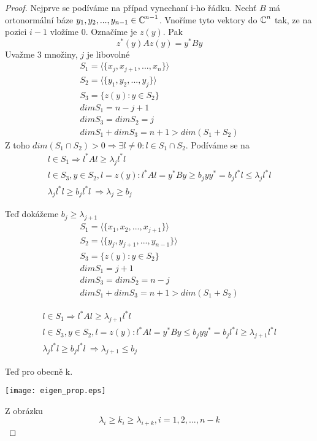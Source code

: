 \begin{proof}
	Nejprve se podíváme na případ vynechaní i-ho řádku.
	Nechť $B$ má ortonormální báze $y_1, y_2, ..., y_{n-1} \in \operatorname{\mathbb{C}}^{n - 1}$.
	Vnoříme tyto vektory do $\operatorname{\mathbb{C}}^n$ tak, ze na pozici $i - 1$ vložíme 0.
	Označíme je $z(y)$.
	Pak
	\[ z^{\ast}(y)Az(y) = y^{\ast}By \]
	Uvažme 3 množiny, $j$ je libovolné
	\begin{gather*}
		S_1 = \langle\{x_j, x_{j+1},..., x_n\} \rangle \\
		S_2 = \langle\{y_1, y_2,..., y_j\} \rangle \\
		S_3 = \{z(y): y \in S_2 \} \\
		dim S_1 = n - j + 1 \\
		dim S_3 = dim S_2 = j \\
		dim S_1 + dim S_3 = n+1 > dim (S_1 + S_2)
	\end{gather*}
	Z toho $dim(S_1 \cap S_2) > 0 \Rightarrow \exists l \ne 0 : l \in S_1 \cap S_2$.
	Podíváme se na
	\begin{gather*}
		l \in S_1 \Rightarrow l^{\ast}Al \geq \lambda_j l^{\ast}l \\
		l \in S_3, y \in S_2, l = z(y): l^{\ast}Al = y^{\ast}By \geq b_j y y^{\ast} = b_j l^{\ast} l \leq \lambda_j l^{\ast}l \\
		\lambda_j l^{\ast}l \geq b_j l^{\ast}l\ \Rightarrow \lambda_j \geq b_j
	\end{gather*}

	Teď dokážeme $ b_j \geq \lambda_{j + 1} $
	\begin{gather*}
		S_1 = \langle\{x_1, x_2,..., x_{j+1}\} \rangle \\
		S_2 = \langle\{y_j, y_{j+1},..., y_{n-1}\} \rangle \\
		S_3 = \{z(y): y \in S_2 \} \\
		dim S_1 = j + 1 \\
		dim S_3 = dim S_2 = n - j \\
		dim S_1 + dim S_3 = n+1 > dim (S_1 + S_2)
	\end{gather*}

	\begin{gather*}
		l \in S_1 \Rightarrow l^{\ast}Al \geq \lambda_{j + 1} l^{\ast}l \\
		l \in S_3, y \in S_2, l = z(y): l^{\ast}Al = y^{\ast}By \leq b_j y y^{\ast} = b_j l^{\ast} l \geq \lambda_{j + 1} l^{\ast}l \\
		\lambda_j l^{\ast}l \geq b_j l^{\ast}l\ \Rightarrow \lambda_{j + 1} \leq b_j
	\end{gather*}

	Teď pro obecně k.

	\texttt{[image: eigen\_prop.eps]}

	Z obrázku
	\[ \lambda_i \geq k_i \geq \lambda_{i + k}, i = 1,2,..., n-k  \]

\end{proof}

